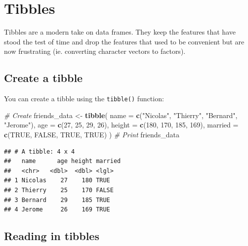 \documentclass[]{book}
\newenvironment{Shaded}{\begin{snugshade}}{\end{snugshade}}
\newcommand{\CommentTok}[1]{\textcolor[rgb]{0.56,0.35,0.01}{\textit{#1}}}
\newcommand{\DataTypeTok}[1]{\textcolor[rgb]{0.13,0.29,0.53}{#1}}
\newcommand{\DecValTok}[1]{\textcolor[rgb]{0.00,0.00,0.81}{#1}}
\newcommand{\KeywordTok}[1]{\textcolor[rgb]{0.13,0.29,0.53}{\textbf{#1}}}
\newcommand{\NormalTok}[1]{#1}
\newcommand{\OtherTok}[1]{\textcolor[rgb]{0.56,0.35,0.01}{#1}}
\newcommand{\StringTok}[1]{\textcolor[rgb]{0.31,0.60,0.02}{#1}}
\begin{document}
\hypertarget{tibbles}{%
\section{Tibbles}\label{tibbles}}

Tibbles are a modern take on data frames. They keep the features that have stood the test of time and drop the features that used to be convenient but are now frustrating (ie. converting character vectors to factors).

\hypertarget{create-a-tibble}{%
\subsection*{Create a tibble}\label{create-a-tibble}}

You can create a tibble using the \texttt{tibble()} function:

\begin{Shaded}
\begin{Highlighting}[]
\CommentTok{# Create}
\NormalTok{friends_data <-}\StringTok{ }\KeywordTok{tibble}\NormalTok{(}
  \DataTypeTok{name =} \KeywordTok{c}\NormalTok{(}\StringTok{"Nicolas"}\NormalTok{, }\StringTok{"Thierry"}\NormalTok{, }\StringTok{"Bernard"}\NormalTok{, }\StringTok{"Jerome"}\NormalTok{),}
  \DataTypeTok{age =} \KeywordTok{c}\NormalTok{(}\DecValTok{27}\NormalTok{, }\DecValTok{25}\NormalTok{, }\DecValTok{29}\NormalTok{, }\DecValTok{26}\NormalTok{),}
  \DataTypeTok{height =} \KeywordTok{c}\NormalTok{(}\DecValTok{180}\NormalTok{, }\DecValTok{170}\NormalTok{, }\DecValTok{185}\NormalTok{, }\DecValTok{169}\NormalTok{),}
  \DataTypeTok{married =} \KeywordTok{c}\NormalTok{(}\OtherTok{TRUE}\NormalTok{, }\OtherTok{FALSE}\NormalTok{, }\OtherTok{TRUE}\NormalTok{, }\OtherTok{TRUE}\NormalTok{)}
\NormalTok{)}
\CommentTok{# Print}
\NormalTok{friends_data}
\end{Highlighting}
\end{Shaded}

\begin{verbatim}
## # A tibble: 4 x 4
##   name      age height married
##   <chr>   <dbl>  <dbl> <lgl>  
## 1 Nicolas    27    180 TRUE   
## 2 Thierry    25    170 FALSE  
## 3 Bernard    29    185 TRUE   
## 4 Jerome     26    169 TRUE
\end{verbatim}

\hypertarget{reading-in-tibbles}{%
\subsection*{Reading in tibbles}\label{reading-in-tibbles}}
\end{document}
